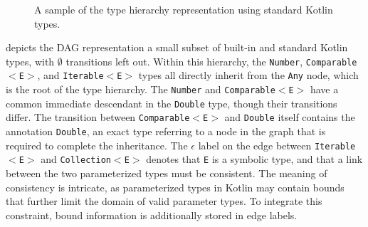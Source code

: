\begin{figure}
    \footnotesize
    \centering
    \caption{A sample of the type hierarchy representation using standard Kotlin types.}
    \label{fig:type-hierarchy}
\end{figure}

 depicts the \Gls{DAG} representation
a small subset of built-in and standard Kotlin types,
with $\emptyset$ transitions left out.
Within this hierarchy, the \texttt{Number}, \texttt{Comparable$<$E$>$}, 
and \texttt{Iterable$<$E$>$} types all directly inherit from the \texttt{Any} node, 
which is the root of the type hierarchy.
The \texttt{Number} and \texttt{Comparable$<$E$>$} have a common immediate descendant in the 
\texttt{Double} type, though their transitions differ.
The transition between \texttt{Comparable$<$E$>$} and \texttt{Double} itself
contains the annotation \texttt{Double}, an exact type referring to a node in the graph
that is required to complete the inheritance.
The $\epsilon$ label on the edge between \texttt{Iterable$<$E$>$} and \texttt{Collection$<$E$>$}
denotes that \texttt{E} is a symbolic type, and that a link between the two parameterized types
must be consistent.
The meaning of consistency is intricate,
as parameterized types in Kotlin may contain bounds
that further limit the domain of valid parameter types.
To integrate this constraint, bound information is additionally
stored in edge labels.

